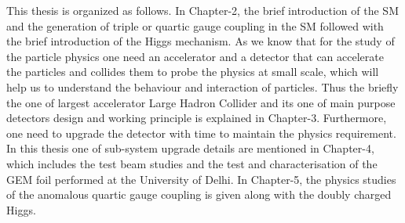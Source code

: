 This thesis is organized as follows. In Chapter-2, the brief introduction of the SM and the generation of triple or quartic gauge coupling in the SM followed with the brief introduction of the Higgs mechanism. As we know that for the study of the particle physics one need an accelerator and a detector that can accelerate the particles and collides them to probe the physics at small scale, which will help us to understand the behaviour and interaction of particles. Thus the briefly the one of largest accelerator Large Hadron Collider and its one of main purpose detectors design and working principle is explained in Chapter-3. Furthermore, one need to upgrade the detector with time to maintain the physics requirement. In this thesis one of sub-system upgrade details are mentioned in Chapter-4, which includes the test beam studies and the test and characterisation of the GEM foil performed at the University of Delhi. In Chapter-5, the physics studies of the anomalous quartic gauge coupling is given along with the doubly charged Higgs.